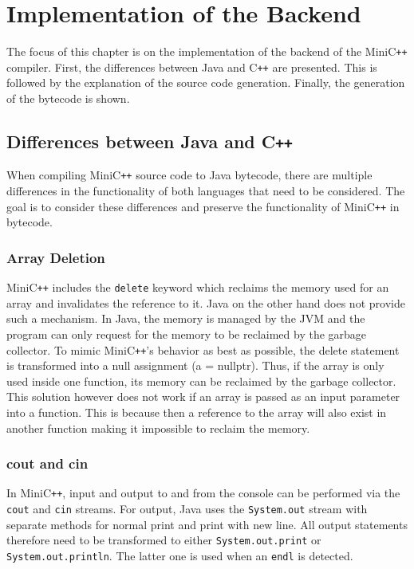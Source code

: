 \chapter{Implementation of the Backend}

The focus of this chapter is on the implementation of the backend of the MiniC\verb|++| compiler. First, the differences between Java and C\verb|++| are presented. This is followed by the explanation of the source code generation. Finally, the generation of the bytecode is shown.

\section{Differences between Java and C\texttt{++}}

When compiling MiniC\verb|++| source code to Java bytecode, there are multiple differences in the functionality of both languages that need to be considered. The goal is to consider these differences and preserve the functionality of MiniC\verb|++| in bytecode. 

\subsection{Array Deletion}

MiniC\verb|++| includes the \verb|delete| keyword which reclaims the memory used for an array and invalidates the reference to it. Java on the other hand does not provide such a mechanism. In Java, the memory is managed by the JVM and the program can only request for the memory to be reclaimed by the garbage collector. To mimic MiniC\verb|++|'s behavior as best as possible, the delete statement is transformed into a null assignment (a = nullptr). Thus, if the array is only used inside one function, its memory can be reclaimed by the garbage collector. This solution however does not work if an array is passed as an input parameter into a function. This is because then a reference to the array will also exist in another function making it impossible to reclaim the memory.  

\subsection{cout and cin}

In MiniC\verb|++|, input and output to and from the console can be performed via the \verb|cout| and \verb|cin| streams. For output, Java uses the \verb|System.out| stream with separate methods for normal print and print with new line. All output statements therefore need to be transformed to either \verb|System.out.print| or \verb|System.out.println|. The latter one is used when an \verb|endl| is detected. 

